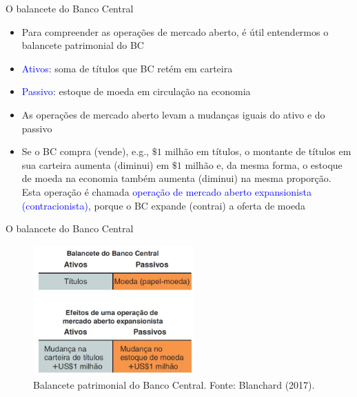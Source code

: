 \documentclass[10pt]{beamer}
\begin{document}
\begin{frame}{O balancete do Banco Central}
    \begin{itemize}
        \item Para compreender as operações de mercado aberto, é útil entendermos o balancete patrimonial do BC
        \bigskip
        \item \textcolor{blue}{Ativos}: soma de títulos que BC retém em carteira
        \bigskip
        \item \textcolor{blue}{Passivo}: estoque de moeda em circulação na economia
        \bigskip
        \item As operações de mercado aberto levam a mudanças iguais do ativo e do passivo
        \bigskip
        \item Se o BC compra (vende), e.g., $\$ 1$ milhão em títulos, o montante de títulos em sua carteira aumenta (diminui) em $\$ 1$ milhão e, da mesma forma, o estoque de moeda na economia também aumenta (diminui) na mesma proporção. Esta operação é chamada \textcolor{blue}{operação de mercado aberto expansionista (contracionista)}, porque o BC expande (contrai) a oferta de moeda
    \end{itemize}
\end{frame}

\begin{frame}{O balancete do Banco Central}
\begin{figure}
    \centering
    \includegraphics[width=0.55\textwidth]{./figures/aula072_fig5.JPG}
    \caption{Balancete patrimonial do Banco Central. Fonte: Blanchard (2017).}
    \label{fig5}
\end{figure}
\end{frame}
\end{document}
